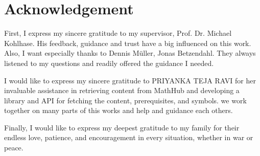\chapter*{Acknowledgement}

First, I express my sincere gratitude to my supervisor, Prof. Dr. Michael Kohlhase. His feedback, guidance and trust have a big influenced on this work. Also, I want especially thanks to Dennis Müller, Jonas Betzendahl. They always listened to my questions and readily offered the guidance I needed.

I would like to express my sincere gratitude to PRIYANKA TEJA RAVI for her invaluable assistance in retrieving content from MathHub and developing a library and API for fetching the content, prerequisites, and symbols. we work together on many parts of this works and help and guidance each others.

 Finally, I would like to express my deepest gratitude to my family for their endless love, patience, and encouragement in every situation, whether in war or peace.